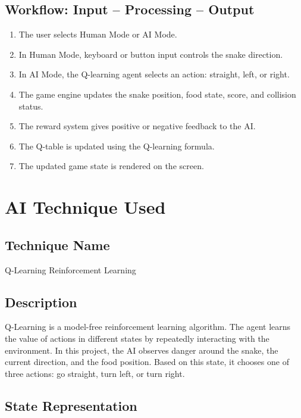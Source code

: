 \documentclass[12pt,a4paper]{article}
\begin{document}
\subsection{Workflow: Input -- Processing -- Output}

\begin{enumerate}[label=\arabic*.]
    \item The user selects Human Mode or AI Mode.
    \item In Human Mode, keyboard or button input controls the snake direction.
    \item In AI Mode, the Q-learning agent selects an action: straight, left, or right.
    \item The game engine updates the snake position, food state, score, and collision status.
    \item The reward system gives positive or negative feedback to the AI.
    \item The Q-table is updated using the Q-learning formula.
    \item The updated game state is rendered on the screen.
\end{enumerate}

\section{AI Technique Used}

\subsection{Technique Name}

Q-Learning Reinforcement Learning

\subsection{Description}

Q-Learning is a model-free reinforcement learning algorithm. The agent learns the value of actions in different states by repeatedly interacting with the environment. In this project, the AI observes danger around the snake, the current direction, and the food position. Based on this state, it chooses one of three actions: go straight, turn left, or turn right.

\subsection{State Representation}
\end{document}
